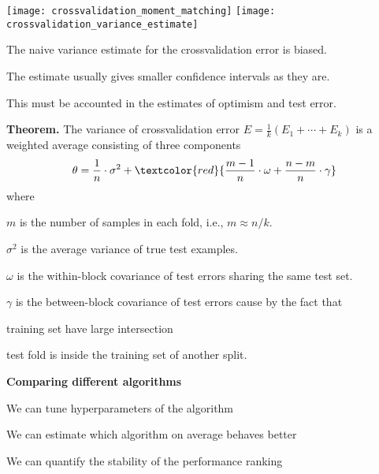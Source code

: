 \documentclass[landscape,footrule]{foils}
\begin{document}
\centerline{
\texttt{[image: crossvalidation\_moment\_matching]}\hspace*{0.5cm}
\texttt{[image: crossvalidation\_variance\_estimate]}}
\vspace*{-.5cm}
\begin{triangles}
\item The naive variance estimate for the crossvalidation error is biased.   
\item The estimate usually gives smaller confidence intervals as they are.  
\item This must be accounted in the estimates of optimism and test error. 
\end{triangles}




\textbf{Theorem.}
The variance of crossvalidation error $E =\frac{1}{k}(E_1+\cdots+E_k)$ is a weighted average consisting of three components
\begin{align*}
\theta = \frac{1}{n}\cdot\sigma^2+\textcolor{red}{\frac{m-1}{n} \cdot\omega + \frac{n-m}{n}\cdot\gamma}
\end{align*} 
where
\begin{triangles}
\item $m$ is the number of samples in each fold, i.e., $m\approx n/k$. 
\item $\sigma^2$ is the average variance of true test examples.
\item $\omega$ is the within-block covariance of test errors sharing the same test set. 
\item $\gamma$ is the between-block covariance of test errors cause by the fact that 
\begin{diamonds}
 \item training set have large intersection
 \item test fold is inside the training set of another split. 
\end{diamonds}   
\end{triangles}

 






\textbf{Comparing different algorithms}
\begin{triangles}
\item We can tune hyperparameters of the algorithm
\item We can estimate which algorithm on average behaves better
\item We can quantify the stability of the performance ranking\vspace*{0.5cm}
\end{triangles} 
\end{document}
